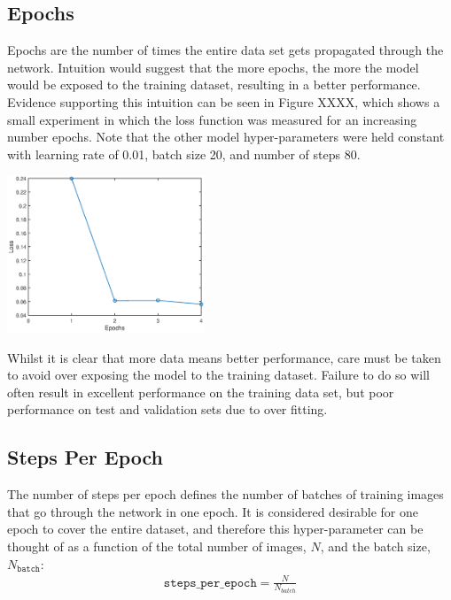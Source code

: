 \documentclass[a4paper]{article}
\begin{document}
\subsection{Epochs}
\begin{minipage}{0.45\textwidth}
Epochs are the number of times the entire data set gets propagated through the network. Intuition would suggest that the more epochs, the more the model would be exposed to the training dataset, resulting in a better performance. Evidence supporting this intuition can be seen in Figure XXXX, which shows a small experiment in which the loss function was measured for an increasing number epochs. Note that the other model hyper-parameters were held constant with learning rate of 0.01, batch size 20, and number of steps 80.
\end{minipage}
\hspace{1cm}
\begin{minipage}{0.45\textwidth}
\centering
\includegraphics[height=4.7cm]{hyp_par_2}
\end{minipage}

\vspace{0.2cm}

Whilst it is clear that more data means better performance, care must be taken to avoid over exposing the model to the training dataset. Failure to do so will often result in excellent performance on the training data set, but poor performance on test and validation sets due to over fitting.

\subsection{Steps Per Epoch}
The number of steps per epoch defines the number of batches of training images that go through the network in one epoch. It is considered desirable for one epoch to cover the entire dataset, and therefore this hyper-parameter can be thought of as a function of the total number of images, $N$, and the batch size, $N_{\texttt{batch}}$:
\begin{align}
	\texttt{steps\_per\_epoch} = \frac{N}{N_{batch}}
\end{align}
\end{document}
